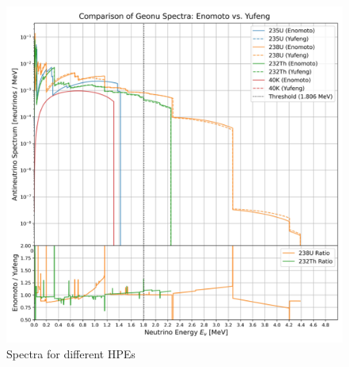 				\begin{figure}[H]
					\centering
					\includegraphics[scale = 0.3]{./Pics/Comparison_of_All_Geonu_Spectra.jpg}
					\caption{Spectra for different HPEs\cite{Enomoto_Spectrum,GeonSpectra-2024}}
					\label{Fig:Geonu Decay}
				\end{figure}
